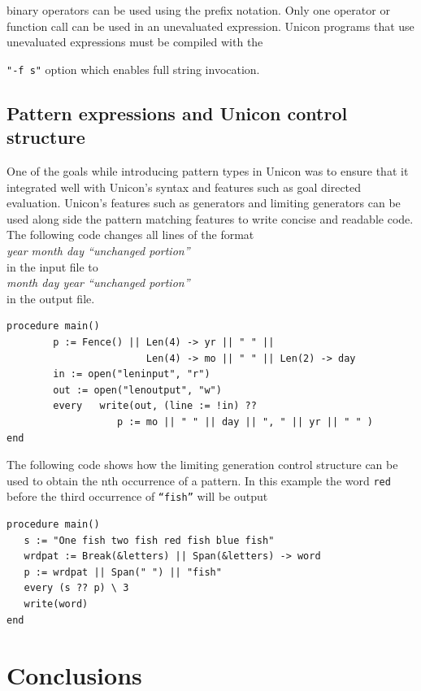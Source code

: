 \documentclass[letterpaper,12pt]{article}
\begin{document}
\noindent binary operators can be used using the prefix notation. Only one
operator or function call can be used in an unevaluated
expression. Unicon programs that use unevaluated expressions must be
compiled with the {\texttt{"-f s"} option which enables full string invocation.

\subsection{Pattern expressions and Unicon control structure}

One of the goals while introducing pattern types in Unicon was to
ensure that it integrated well with Unicon's syntax and features such
as goal directed evaluation. Unicon’s features such as generators and
limiting generators can be used along side the pattern matching
features to write concise and readable code.
The following code changes all lines of the format \\
	\textit{year month day “unchanged portion”} \\
in the input file to \\
	\textit{month day year “unchanged portion”} \\
in the output file.

\begin{verbatim}
procedure main()
        p := Fence() || Len(4) -> yr || " " || 
                        Len(4) -> mo || " " || Len(2) -> day
        in := open("leninput", "r")
        out := open("lenoutput", "w")
        every	write(out, (line := !in) ?? 
                   p := mo || " " || day || ", " || yr || " " )
end
\end{verbatim}

The following code shows how the limiting generation control structure
can be used to obtain the nth occurrence of a pattern. In this example
the word \texttt{red} before the third occurrence of \texttt{“fish”}
will be output

\begin{verbatim}
procedure main()
   s := "One fish two fish red fish blue fish"
   wrdpat := Break(&letters) || Span(&letters) -> word
   p := wrdpat || Span(" ") || "fish"
   every (s ?? p) \ 3
   write(word)
end 
\end{verbatim}


\section{Conclusions}

}
\end{document}
